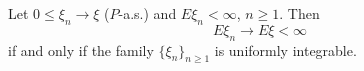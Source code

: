 Let $0 \leq \xi_n \to \xi$ ($P$-a.s.) and $E\xi_n < \infty$, $n \geq 1$. Then
$$E\xi_n \to E\xi < \infty$$
if and only if the family $\{\xi_n\}_{n \geq 1}$ is uniformly integrable.
